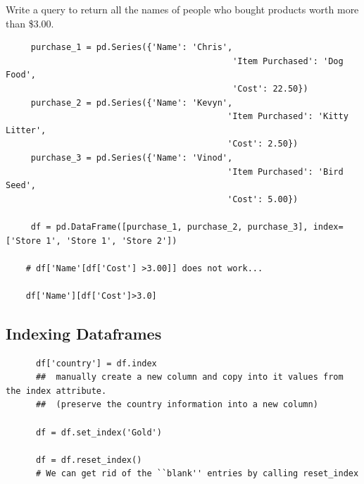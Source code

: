 \documentclass[11pt]{article}
\begin{document}
    Write a query to return all the names of people who bought products worth more than \$3.00.
    \begin{lstlisting}
     purchase_1 = pd.Series({'Name': 'Chris',
                                             'Item Purchased': 'Dog Food',
                                             'Cost': 22.50})
     purchase_2 = pd.Series({'Name': 'Kevyn',
                                            'Item Purchased': 'Kitty Litter',
                                            'Cost': 2.50})
     purchase_3 = pd.Series({'Name': 'Vinod',
                                            'Item Purchased': 'Bird Seed',
                                            'Cost': 5.00})

     df = pd.DataFrame([purchase_1, purchase_2, purchase_3], index=['Store 1', 'Store 1', 'Store 2'])
     
    # df['Name'[df['Cost'] >3.00]] does not work...

    df['Name'][df['Cost']>3.0]
    \end{lstlisting}

     
    \subsection{Indexing Dataframes}

    \begin{lstlisting}
      df['country'] = df.index
      ##  manually create a new column and copy into it values from the index attribute. 
      ##  (preserve the country information into a new column)

      df = df.set_index('Gold')

      df = df.reset_index()
      # We can get rid of the ``blank'' entries by calling reset_index
    \end{lstlisting}
\end{document}
